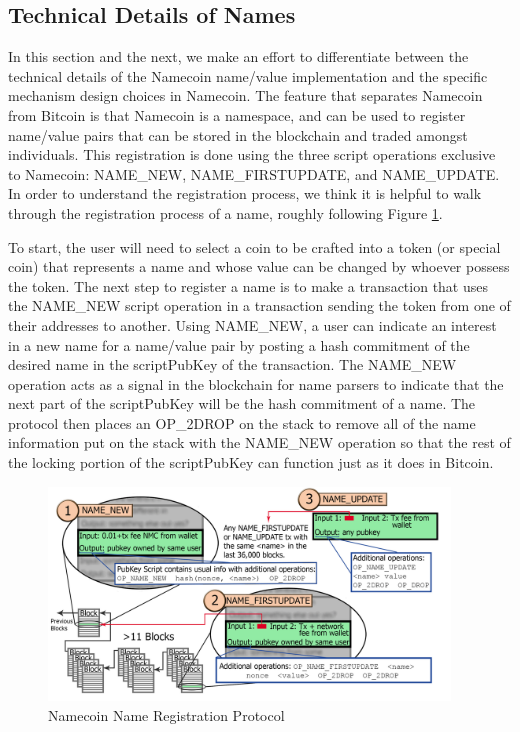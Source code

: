 \subsection{Technical Details of Names}

In this section and the next, we make an effort to differentiate between the technical details of the Namecoin name/value implementation and the specific mechanism design choices in Namecoin. The feature that separates Namecoin from Bitcoin is that Namecoin is a namespace, and can be used to register name/value pairs that can be stored in the blockchain and traded amongst individuals. This registration is done using the three script operations exclusive to Namecoin: NAME\_NEW, NAME\_FIRSTUPDATE, and NAME\_UPDATE. In order to understand the registration process, we think it is helpful to walk through the registration process of a name, roughly following Figure \ref{fig:registration}. 

To start, the user will need to select a coin to be crafted into a token (or special coin) that represents a name and whose value can be changed by whoever possess the token. The next step to register a name is to make a transaction that uses the NAME\_NEW script operation in a transaction sending the token from one of their addresses to another. Using NAME\_NEW, a user can indicate an interest in a new name for a name/value pair by posting a hash commitment of the desired name in the scriptPubKey of the transaction. The NAME\_NEW operation acts as a signal in the blockchain for name parsers to indicate that the next part of the scriptPubKey will be the hash commitment of a name. The protocol then places an OP\_2DROP on the stack to remove all of the name information put on the stack with the NAME\_NEW operation so that the rest of the locking portion of the scriptPubKey can function just as it does in Bitcoin. 

\begin{figure}
  \centering
  \includegraphics[width=0.95\textwidth]{registration.png}
  \caption{Namecoin Name Registration Protocol}
  \label{fig:registration}
\end{figure}


